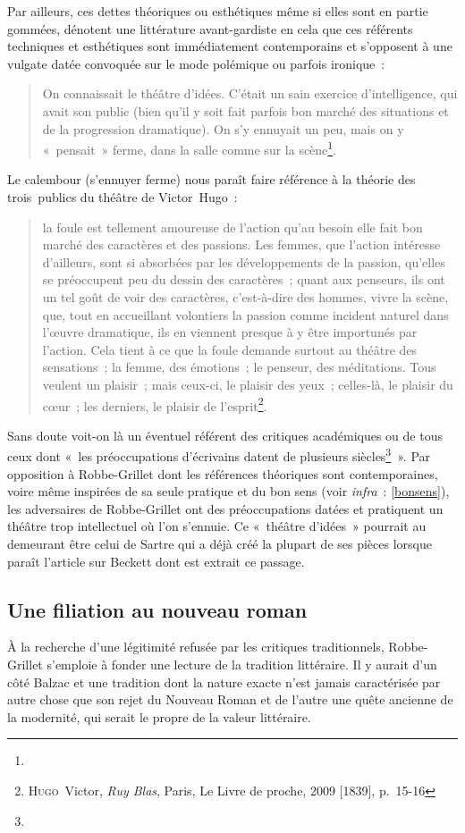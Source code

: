 Par ailleurs, ces dettes théoriques ou esthétiques même si elles sont en partie gommées, dénotent une littérature avant-gardiste en cela que ces référents techniques et esthétiques sont immédiatement contemporains et s'opposent à une vulgate datée convoquée sur le mode polémique ou parfois ironique~:
\begin{quote}
    On connaissait le théâtre d’idées. C’était un sain exercice d’intelligence, qui avait son public (bien qu’il y soit fait parfois bon marché des situations et de la progression dramatique). On s’y ennuyait un peu, mais on y «~pensait~» ferme, dans la salle comme sur la scène\footnote{}.
\end{quote}
Le calembour (s'ennuyer ferme) nous paraît faire référence à la théorie des trois~publics du théâtre de Victor~Hugo~:
\begin{quote}
    la foule est tellement amoureuse de l'action qu'au besoin elle fait bon marché des caractères et des passions. Les femmes, que l'action intéresse d'ailleurs, sont si absorbées par les développements de la passion, qu'elles se préoccupent peu du dessin des caractères~; quant aux penseurs, ils ont un tel goût de voir des caractères, c'est-à-dire des hommes, vivre la scène, que, tout en accueillant volontiers la passion comme incident naturel dans l'œuvre dramatique, ils en viennent presque à y être importunés par l'action. Cela tient à ce que la foule demande surtout au théâtre des sensations~; la femme, des émotions~; le penseur, des méditations. Tous veulent un plaisir~; mais ceux-ci, le plaisir des yeux~; celles-là, le plaisir du cœur~; les derniers, le plaisir de l'esprit\footnote{\textsc{Hugo}~Victor, \textit{Ruy Blas}, Paris, Le Livre de proche, 2009 [1839], p.~15-16}.
\end{quote}
Sans doute voit-on là un éventuel référent des critiques académiques ou de tous ceux dont «~les préoccupations d’écrivains datent de plusieurs siècles\footnote{}~». Par opposition à Robbe-Grillet dont les références théoriques sont contemporaines, voire même inspirées de sa seule pratique et du bon sens (voir \textit{infra}~: \ref{bonsens}), les adversaires de Robbe-Grillet ont des préoccupations datées et pratiquent un théâtre trop intellectuel où l'on s'ennuie. Ce «~théâtre d'idées~» pourrait au demeurant être celui de Sartre qui a déjà créé la plupart de ses pièces lorsque paraît l'article sur Beckett dont est extrait ce passage.



\subsection{Une filiation au nouveau roman}
\label{filiation}
À la recherche d'une légitimité refusée par les critiques traditionnels, Robbe-Grillet s'emploie à fonder une lecture de la tradition littéraire. Il y aurait d'un côté Balzac et une tradition dont la nature exacte n'est jamais caractérisée par autre chose que son rejet du Nouveau Roman et de l'autre une quête ancienne de la modernité, qui serait le propre de la valeur littéraire.




